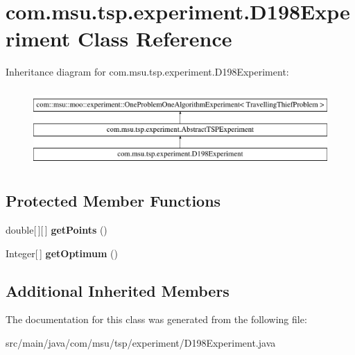 \hypertarget{classcom_1_1msu_1_1tsp_1_1experiment_1_1D198Experiment}{\section{com.\-msu.\-tsp.\-experiment.\-D198\-Experiment Class Reference}
\label{classcom_1_1msu_1_1tsp_1_1experiment_1_1D198Experiment}
}
Inheritance diagram for com.\-msu.\-tsp.\-experiment.\-D198\-Experiment\-:\begin{figure}[H]
\begin{center}
\leavevmode
\includegraphics[height=3.000000cm]{classcom_1_1msu_1_1tsp_1_1experiment_1_1D198Experiment}
\end{center}
\end{figure}
\subsection*{Protected Member Functions}
\begin{DoxyCompactItemize}
\item 
\hypertarget{classcom_1_1msu_1_1tsp_1_1experiment_1_1D198Experiment_a29aad59f39ff13b70449bf053a6e6ab6}{double\mbox{[}$\,$\mbox{]}\mbox{[}$\,$\mbox{]} {\bfseries get\-Points} ()}\label{classcom_1_1msu_1_1tsp_1_1experiment_1_1D198Experiment_a29aad59f39ff13b70449bf053a6e6ab6}

\item 
\hypertarget{classcom_1_1msu_1_1tsp_1_1experiment_1_1D198Experiment_af4a38a000971d7caf8b97dcd954da2b5}{Integer\mbox{[}$\,$\mbox{]} {\bfseries get\-Optimum} ()}\label{classcom_1_1msu_1_1tsp_1_1experiment_1_1D198Experiment_af4a38a000971d7caf8b97dcd954da2b5}

\end{DoxyCompactItemize}
\subsection*{Additional Inherited Members}


The documentation for this class was generated from the following file\-:\begin{DoxyCompactItemize}
\item 
src/main/java/com/msu/tsp/experiment/D198\-Experiment.\-java\end{DoxyCompactItemize}
